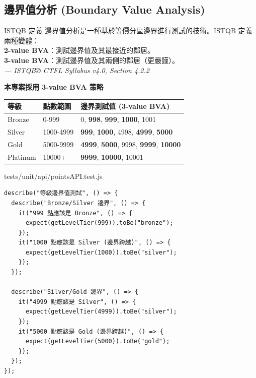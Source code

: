 \documentclass[11pt, a4paper]{article}
\begin{document}
\subsection{邊界值分析 (Boundary Value Analysis)}

\begin{calloutbox}{ISTQB 定義}
  邊界值分析是一種基於等價分區邊界進行測試的技術。ISTQB 定義兩種變體：\\
  \textbf{2-value BVA}：測試邊界值及其最接近的鄰居。\\
  \textbf{3-value BVA}：測試邊界值及其兩側的鄰居（更嚴謹）。\\
  \textit{--- ISTQB® CTFL Syllabus v4.0, Section 4.2.2}
\end{calloutbox}

\textbf{本專案採用 3-value BVA 策略}

\vspace{0.3cm}
\begin{center}
  \renewcommand{\arraystretch}{1.4}
  \begin{tabular}{p{} p{} p{}}
    \toprule
    \textbf{等級}                   & \textbf{點數範圍} & \textbf{邊界測試值 (3-value BVA)}                                      \\
    \midrule
    Bronze                        & 0-999         & 0, \textbf{998}, \textbf{999}, \textbf{1000}, 1001                \\
    \rowcolor{LightGray} Silver   & 1000-4999     & \textbf{999}, \textbf{1000}, 4998, \textbf{4999}, \textbf{5000}   \\
    Gold                          & 5000-9999     & \textbf{4999}, \textbf{5000}, 9998, \textbf{9999}, \textbf{10000} \\
    \rowcolor{LightGray} Platinum & 10000+        & \textbf{9999}, \textbf{10000}, 10001                              \\
    \bottomrule
  \end{tabular}
\end{center}

\begin{codebox}{tests/unit/api/pointsAPI.test.js}
  \begin{lstlisting}
describe("等級邊界值測試", () => {
  describe("Bronze/Silver 邊界", () => {
    it("999 點應該是 Bronze", () => {
      expect(getLevelTier(999)).toBe("bronze");
    });
    it("1000 點應該是 Silver (邊界跨越)", () => {
      expect(getLevelTier(1000)).toBe("silver");
    });
  });

  describe("Silver/Gold 邊界", () => {
    it("4999 點應該是 Silver", () => {
      expect(getLevelTier(4999)).toBe("silver");
    });
    it("5000 點應該是 Gold (邊界跨越)", () => {
      expect(getLevelTier(5000)).toBe("gold");
    });
  });
});
\end{lstlisting}
\end{codebox}
\end{document}
